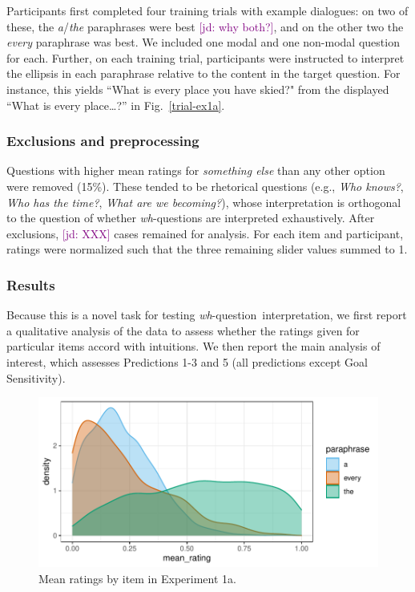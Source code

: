 \documentclass[12pt,letterpaper,table,svgnames,dvipsnames]{article}
\newcommand{\jd}[1]{\textcolor{Purple}{[jd: #1]}}
\newcommand{\figref}[1]{Fig.~\ref{#1}}
\newcommand{\whq}{\emph{wh}-question~}
\begin{document}
Participants first completed four training trials with example dialogues: on two of these, the \emph{a}/\emph{the} paraphrases were best \jd{why both?}, and on the other two the \emph{every} paraphrase was best. We included one modal and one non-modal question for each. Further, on each training trial, participants were instructed to interpret the ellipsis in each paraphrase relative to the content in the target question. For instance, this yields ``What is every place you have skied?" from the displayed ``What is every place\dots?'' in \figref{trial-ex1a}.

\subsubsection{Exclusions and preprocessing}
Questions with higher mean ratings for \emph{something else} than any other option were removed (15\%). These tended to be rhetorical questions (e.g., \emph{Who knows?}, \emph{Who has the time?}, \emph{What are we becoming?}), whose interpretation is orthogonal to the question of whether \emph{wh}-questions are interpreted exhaustively. After exclusions, \jd{XXX} cases remained for analysis. For each item and participant, ratings were normalized such that the three remaining slider values summed to 1.  

\subsubsection{Results}
Because this is a novel task for testing \whq interpretation, we first report a qualitative analysis of the data to assess whether the ratings given for particular items accord with intuitions. We then report the main analysis of interest, which assesses Predictions 1-3 and 5 (all predictions except Goal Sensitivity). 

\begin{figure}[h!]
\centering
\includegraphics[scale=.8]{figures/ex1a_denisty_mean_ratings.pdf}
\caption{Mean ratings by item in Experiment 1a.}
\label{ex1a_density_mr}
\end{figure}
\end{document}
